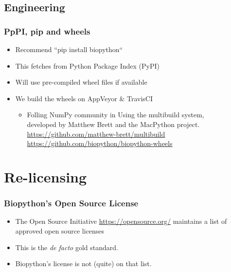 \subsection{Engineering}

\begin{frame}
\frametitle{PpPI, pip and wheels}
\begin{itemize}
\item Recommend ``pip install biopython``
\item This fetches from Python Package Index (PyPI)
\item Will use pre-compiled wheel files if available
\item We build the wheels on AppVeyor \& TravisCI
    \begin{itemize}
        \item Folling NumPy community in Using the multibuild system, \\
              developed by Matthew Brett and the MacPython project. \\
              \url{https://github.com/matthew-brett/multibuild} \\
              \url{https://github.com/biopython/biopython-wheels}
    \end{itemize}
\end{itemize}
\end{frame}

\section{Re-licensing}

\begin{frame}
\frametitle{Biopython's Open Source License}
\begin{itemize}
\item The Open Source Initiative \url{https://opensource.org/}
    maintains a list of approved open source licenses
\item This is the \textit{de facto} gold standard.
\item Biopython's license is not (quite) on that list.
\end{itemize}
\end{frame}

